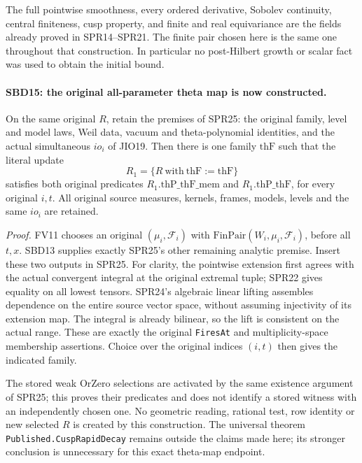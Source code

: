 The full pointwise smoothness, every ordered derivative,
Sobolev continuity, central finiteness, cusp property, and
finite and real equivariance are the fields already proved
in SPR14--SPR21.  The finite pair chosen here is the same
one throughout that construction.  In particular no
post-Hilbert growth or scalar fact was used to obtain the
initial bound.

\paragraph{SBD15: the original all-parameter theta map is now constructed.}
\label{claim:SBD15}
On the same original \(R\), retain the premises of SPR25:
the original family, level and model laws, Weil data,
vacuum and theta-polynomial identities, and the actual
simultaneous \(io_i\) of JIO19.  Then there is one family
\(\mathrm{thF}\) such that the literal update
\[
                  R_1=\{R\ \mathrm{with}\ \mathrm{thF}:=\mathrm{thF}\}
\]
satisfies both original predicates
\(R_1.\mathrm{thP\_thF\_mem}\) and
\(R_1.\mathrm{thP\_thF}\), for every original \(i,t\).
All original source measures, kernels, frames, models,
levels and the same \(io_i\) are retained.

\emph{Proof.}
FV11 chooses an original \((\mu_i,\mathcal F_i)\) with
\(\mathrm{FinPair}(W_i,\mu_i,\mathcal F_i)\), before all
\(t,x\).  SBD13 supplies exactly SPR25's other remaining
analytic premise.  Insert these two outputs in SPR25.
For clarity, the pointwise extension first agrees with the
actual convergent integral at the original extremal tuple;
SPR22 gives equality on all lowest tensors.  SPR24's
algebraic linear lifting assembles dependence on the entire
source vector space, without assuming injectivity of its
extension map.  The integral is already bilinear, so the
lift is consistent on the actual range.  These are exactly
the original \texttt{Fires\allowbreak At} and multiplicity-space
membership assertions.  Choice over the original indices
\((i,t)\) then gives the indicated family.

The stored weak \(\mathrm{OrZero}\) selections are activated
by the same existence argument of SPR25; this proves their
predicates and does not identify a stored witness with an
independently chosen one.  No geometric reading, rational
test, row identity or new selected \(R\) is created by this
construction.  The universal theorem
\texttt{Published.\allowbreak Cusp\allowbreak Rapid\allowbreak Decay} remains outside the
claims made here; its stronger conclusion is unnecessary
for this exact theta-map endpoint.

